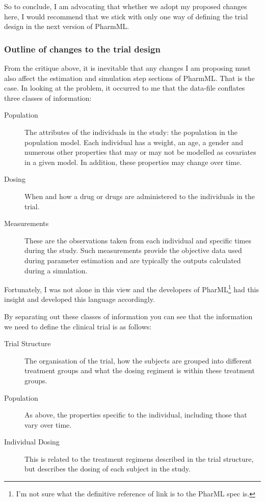 \documentclass[a4paper,10pt]{article}
\newcommand{\pharmml}{PharmML\xspace}
\begin{document}
%
So to conclude, I am advocating that whether we adopt my proposed
changes here, I would recommend that we stick with only one way of
defining the trial design in the next version of \pharmml.

\subsubsection{Outline of changes to the trial design}

From the critique above, it is inevitable that any changes I am
proposing must also affect the estimation and simulation step sections
of \pharmml. That is the case. In looking at the problem, it occurred
to me that the data-file conflates three classes of information:
\begin{description}
\item[Population] The attributes of the individuals in the study: the
  population in the population model. Each individual has a weight,
  an age, a gender and numerous other properties that may or may not
  be modelled as covariates in a given model. In addition, these
  properties may change over time.
\item[Dosing] When and how a drug or drugs are administered to the
  individuals in the trial.
\item[Measurements] These are the observations taken from each
  individual and specific times during the study. Such measurements
  provide the objective data used during parameter estimation and are
  typically the outputs calculated during a simulation.
\end{description}
Fortunately, I was not alone in this view and the developers of
PharML\footnote{I'm not sure what the definitive reference of link is
  to the PharML spec is.} had this insight and developed this language
accordingly.

By separating out these classes of information you can see that the
information we need to define the clinical trial is as follows:
\begin{description}
\item[Trial Structure] The organisation of the trial, how the subjects
  are grouped into different treatment groups and what the dosing
  regiment is within these treatment groups.
\item[Population] As above, the properties specific to the individual,
  including those that vary over time.
\item[Individual Dosing] This is related to the treatment regimens
  described in the trial structure, but describes the dosing of each
  subject in the study.
\end{description}
\end{document}
